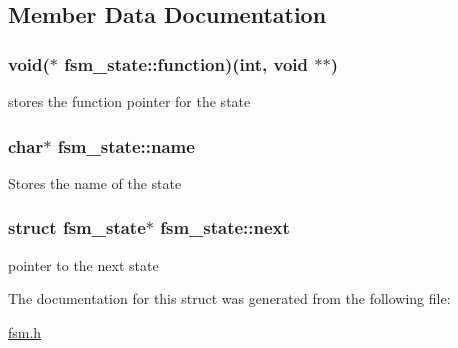 \subsection{Member Data Documentation}
\hypertarget{structfsm__state_a3610efd3db68ca9d4822540a830a8684}{
\subsubsection[{function}]{\setlength{\rightskip}{0pt plus 5cm}void($\ast$ {\bf fsm\_\-state::function})(int, void $\ast$$\ast$)}}
\label{structfsm__state_a3610efd3db68ca9d4822540a830a8684}
stores the function pointer for the state \hypertarget{structfsm__state_a440a3e1fb27cc0f14c33b3ce17e46fcc}{
\subsubsection[{name}]{\setlength{\rightskip}{0pt plus 5cm}char$\ast$ {\bf fsm\_\-state::name}}}
\label{structfsm__state_a440a3e1fb27cc0f14c33b3ce17e46fcc}
Stores the name of the state \hypertarget{structfsm__state_a9a6566cdfa091b10cb9a68928d7340bb}{
\subsubsection[{next}]{\setlength{\rightskip}{0pt plus 5cm}struct {\bf fsm\_\-state}$\ast$ {\bf fsm\_\-state::next}}}
\label{structfsm__state_a9a6566cdfa091b10cb9a68928d7340bb}
pointer to the next state 

The documentation for this struct was generated from the following file:\begin{DoxyCompactItemize}
\item 
\hyperlink{fsm_8h}{fsm.h}\end{DoxyCompactItemize}
